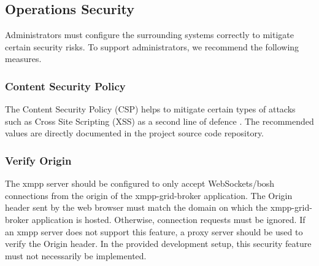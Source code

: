 \subsection{Operations Security}\label{sec:ops-security}

Administrators must configure the surrounding systems correctly to mitigate certain security risks.
To support administrators, we recommend the following measures.

\subsubsection{Content Security Policy}

The Content Security Policy (CSP) helps to mitigate certain types of attacks such as Cross Site Scripting (XSS) as a second line of defence \cite{w3c-csp}.
The recommended values are directly documented in the project source code repository.

\subsubsection{Verify Origin}
The \gls{xmpp} server should be configured to only accept WebSockets/\gls{bosh} connections from the origin of the \gls{xmpp-grid-broker} application.
The Origin header sent by the web browser must match the domain on which the \gls{xmpp-grid-broker} application is hosted.
Otherwise, connection requests must be ignored.
If an \gls{xmpp} server does not support this feature, a proxy server should be used to verify the Origin header.
In the provided development setup, this security feature must not necessarily be implemented.
